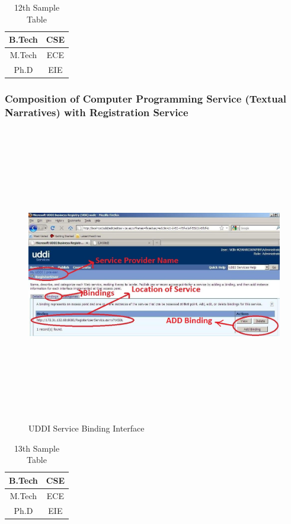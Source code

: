 \begin{table}
 \begin{center}
 \caption{12th Sample Table}
 \begin{tabular}{|c|c|}
 \hline
 B.Tech & CSE\\
 \hline
 M.Tech & ECE\\
 \hline
 Ph.D & EIE\\
 \hline 
 \end{tabular}
 \end{center}
\end{table}
\subsubsection{Composition of Computer Programming Service (Textual Narratives) with Registration Service}
\blindtext
\begin{figure}[h!]
 \centering
 \includegraphics[width=16cm,height=13cm]{uddi_service_binding_interface.jpg}
 \caption{UDDI Service Binding Interface}
\end{figure}

\begin{table}
 \begin{center}
 \caption{13th Sample Table}
 \begin{tabular}{|c|c|}
 \hline
 B.Tech & CSE\\
 \hline
 M.Tech & ECE\\
 \hline
 Ph.D & EIE\\
 \hline 
 \end{tabular}
 \end{center}
\end{table}
